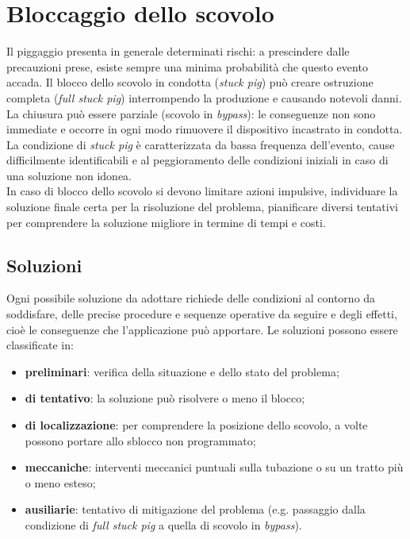 \section{Bloccaggio dello scovolo}
Il piggaggio presenta in generale determinati rischi: a prescindere dalle precauzioni prese, esiste sempre una minima probabilità che questo evento accada. Il blocco dello scovolo in condotta (\textit{stuck pig}) può creare ostruzione completa (\textit{full stuck pig}) interrompendo la produzione e causando notevoli danni. La chiusura può essere parziale (scovolo in \textit{bypass}): le conseguenze non sono immediate e occorre in ogni modo rimuovere il dispositivo incastrato in condotta.\\
La condizione di \textit{stuck pig} è caratterizzata da bassa frequenza dell'evento, cause difficilmente identificabili e al peggioramento delle condizioni iniziali in caso di una soluzione non idonea.\\
In caso di blocco dello scovolo si devono limitare azioni impulsive, individuare la soluzione finale certa per la risoluzione del problema, pianificare diversi tentativi per comprendere la soluzione migliore in termine di tempi e costi.
\subsection{Soluzioni}
Ogni possibile soluzione da adottare richiede delle condizioni al contorno da soddisfare, delle precise procedure e sequenze operative da seguire e degli effetti, cioè le conseguenze che l'applicazione può apportare. Le soluzioni possono essere classificate in:
\begin{itemize}
	\item \textbf{preliminari}: verifica della situazione e dello stato del problema;
	\item \textbf{di tentativo}: la soluzione può risolvere o meno il blocco;
	\item \textbf{di localizzazione}: per comprendere la posizione dello scovolo, a volte possono portare allo sblocco non programmato;
	\item \textbf{meccaniche}: interventi meccanici puntuali sulla tubazione o su un tratto più o meno esteso;
	\item \textbf{ausiliarie}: tentativo di mitigazione del problema (e.g. passaggio dalla condizione di \textit{full stuck pig} a quella di scovolo in \textit{bypass}).
\end{itemize}

